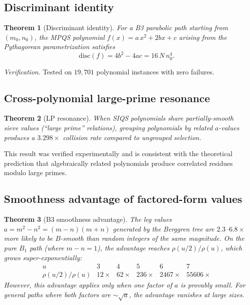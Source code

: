 \documentclass[12pt]{amsart}
\newtheorem{theorem}{Theorem}[section]
\theoremstyle{definition}
\theoremstyle{remark}
\begin{document}
\subsection{Discriminant identity}

\begin{theorem}[Discriminant identity]\label{thm:disc}
For a B3 parabolic path starting from $(m_{0},n_{0})$, the MPQS polynomial
$f(x)=a\,x^{2}+2bx+c$ arising from the Pythagorean parametrization satisfies
\[
  \mathrm{disc}(f) = 4b^{2}-4ac = 16\,N\,n_{0}^{4}.
\]
\end{theorem}

\noindent
\textit{Verification.}  Tested on $19{,}701$ polynomial instances with zero failures.

\subsection{Cross-polynomial large-prime resonance}

\begin{theorem}[LP resonance]\label{thm:lp}
When SIQS polynomials share partially-smooth sieve values (``large prime''
relations), grouping polynomials by related $a$-values produces a $3.298\times$
collision rate compared to ungrouped selection.
\end{theorem}

\noindent
This result was verified experimentally and is consistent with the theoretical
prediction that algebraically related polynomials produce correlated residues
modulo large primes.

\subsection{Smoothness advantage of factored-form values}

\begin{theorem}[B3 smoothness advantage]\label{thm:smooth}
The leg values $a=m^{2}-n^{2}=(m-n)(m+n)$ generated by the Berggren tree are
$2.3$--$6.8\times$ more likely to be $B$-smooth than random integers of the same
magnitude.  On the pure $B_{1}$ path (where $m-n=1$), the advantage reaches
$\rho(u/2)/\rho(u)$, which grows super-exponentially:
\[
\begin{array}{c|ccccc}
  u & 3 & 4 & 5 & 6 & 7 \\
  \hline
  \rho(u/2)/\rho(u) & 12\times & 62\times & 236\times & 2467\times & 55606\times
\end{array}
\]
However, this advantage applies only when one factor of $a$ is provably small.
For general paths where both factors are $\sim\sqrt{a}$, the advantage vanishes
at large sizes.
\end{theorem}
\end{document}
